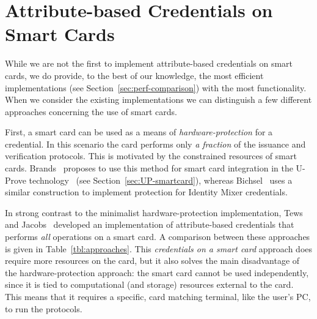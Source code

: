 \section{Attribute-based Credentials on Smart Cards}

While we are not the first to implement attribute-based credentials on smart
cards, we do provide, to the best of our knowledge, the most efficient
implementations (see Section~\ref{sec:perf-comparison}) with the most
functionality. When we consider the existing implementations we can distinguish
a few different approaches concerning the use of smart cards.

First, a smart card can be used as a means of \emph{hardware-protection} for a
credential. In this scenario the card performs only \emph{a fraction} of the
issuance and verification protocols. This is motivated by the constrained
resources of smart cards. Brands~\cite[Chapter 6]{Brands2000} proposes to use
this method for smart card integration in the U-Prove
technology~\cite{U-Prove_Overview2011} (see Section~\ref{sec:UP-smartcard}),
whereas Bichsel~\cite{Bichsel2007} uses a similar construction to implement
protection for Identity Mixer credentials.

In strong contrast to the minimalist hardware-protection implementation, Tews
and Jacobs~\cite{TewsJacobs09} developed an implementation of attribute-based
credentials that performs \emph{all} operations on a smart card. A comparison
between these approaches is given in Table~\ref{tbl:approaches}. This
\emph{credentials on a smart card} approach does require more resources on the
card, but it also solves the main disadvantage of the hardware-protection
approach: the smart card cannot be used independently, since it is tied to
computational (and storage) resources external to the card. This means that it
requires a specific, card matching terminal, like the user's PC, to run
the protocols.

